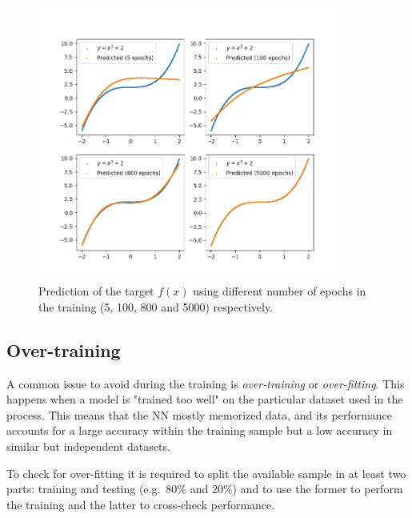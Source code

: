 \begin{figure}[htb]
\centering
\includegraphics[width=0.9\textwidth]{figures/training_vs_epoch}
\caption{Prediction of the target $f(x)$ using different number of epochs in the training (5, 100, 800 and 5000) respectively.}
\label{fig:training_vs_epochs}
\end{figure}

\subsection{Over-training}
\label{sec:overtraining}
A common issue to avoid during the training is \emph{over-training} or \emph{over-fitting}. 
This happens when a model is "trained too well" on the particular dataset used in the process. This means that the NN mostly memorized data, and its performance accounts for a large accuracy within the training sample but a low accuracy in similar but independent datasets. 

To check for over-fitting it is required to split the available sample in at least two parts: training and testing (e.g.~80\% and 20\%) and to use the former to perform the training and the latter to cross-check performance.


